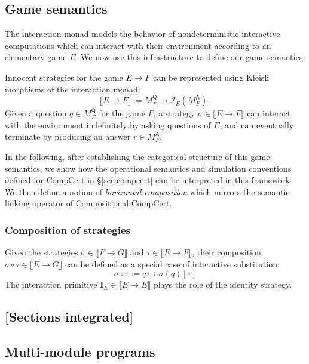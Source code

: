 \documentclass[format=sigplan,authordraft]{acmart}
\newcommand{\kw}[1]{\ensuremath{\mathsf{#1}}}
\begin{document}

\subsection{Game semantics}

The interaction monad
models the behavior of
nondeterministic interactive computations
which can interact with their environment
according to an elementary game $E$.
We now use this infrastructure
to define our game semantics.

Innocent strategies for the game $E \rightarrow F$
can be represented using Kleisli morphisms of
the interaction monad:
\[
  \llbracket E \rightarrow F \rrbracket :=
  M_F^\kw{Q} \rightarrow \mathcal{I}_E(M_F^\kw{A}) \,.
\]
Given a question $q \in M_F^\kw{Q}$ for the game $F$,
a strategy $\sigma \in \llbracket E \rightarrow F \rrbracket$
can interact with the environment
indefinitely by asking questions of $E$,
and can eventually terminate by producing an answer $r \in M_F^\kw{A}$.

In the following,
after establishing the categorical structure
of this game semantics,
we show how
the operational semantics
and simulation conventions
defined for CompCert in \S\ref{sec:compcert}
can be interpreted in this framework.
We then define a notion of \emph{horizontal composition}
which mirrors the semantic linking operator
of Compositional CompCert.

\subsubsection{Composition of strategies}

Given the strategies
$\sigma \in \llbracket F \rightarrow G \rrbracket$ and
$\tau \in \llbracket E \rightarrow F \rrbracket$,
their composition
$\sigma \circ \tau \in \llbracket E \rightarrow G \rrbracket$
can be defined as a special case of interactive substitution:
\[
    \sigma \circ \tau := q \mapsto \sigma(q)[\tau]
\]
The interaction primitive
$\mathbf{I}_E \in \llbracket E \rightarrow E \rrbracket$
plays the role of the identity strategy.

\subsection*{[Sections integrated]}

\subsection{Multi-module programs}
\end{document}
